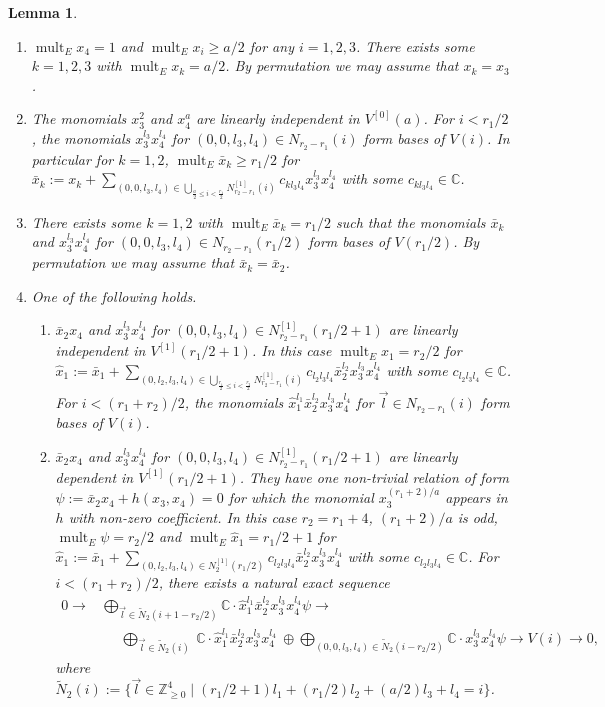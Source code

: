 \documentclass[a4paper,11pt]{amsart}
\newtheorem{lemma}[theorem]{Lemma}
\theoremstyle{definition}
\theoremstyle{remark}
\numberwithin{equation}{section}
\newcommand{\bC}{{\mathbb C}}
\newcommand{\bZ}{{\mathbb Z}}
\newcommand{\mult}{\operatorname{mult}}
\begin{document}
\begin{lemma}\label{lem:vector}
\begin{enumerate}
\item\label{itm:vector1}
$\mult_E x_4=1$ and $\mult_E x_i\ge a/2$ for any $i=1,2,3$.
There exists some $k=1,2,3$ with $\mult_E x_k=a/2$.
By permutation we may assume that $x_k=x_3$.
\item\label{itm:vector2}
The monomials $x_3^2$ and $x_4^a$ are linearly independent in $V^{[0]}(a)$.
For $i<r_1/2$,
the monomials $x_3^{l_3}x_4^{l_4}$ for
$(0,0,l_3,l_4)\in N_{r_2-r_1}(i)$
form bases of $V(i)$.
In particular for $k=1,2$,
$\mult_E \bar{x}_k \ge r_1/2$ for
$\bar{x}_k:=x_k+\sum_{(0,0,l_3,l_4)\in
\bigcup_{\frac{a}{2}\le i<\frac{r_1}{2}}N_{r_2-r_1}^{[1]}(i)}
c_{kl_3l_4}x_3^{l_3}x_4^{l_4}$
with some $c_{kl_3l_4}\in \bC$.
\item\label{itm:vector3}
There exists some $k=1,2$ with $\mult_E \bar{x}_k=r_1/2$ such that
the monomials $\bar{x}_k$ and $x_3^{l_3}x_4^{l_4}$ for
$(0,0,l_3,l_4)\in N_{r_2-r_1}(r_1/2)$ form bases of $V(r_1/2)$.
By permutation we may assume that $\bar{x}_k=\bar{x}_2$.
\item\label{itm:vector4}
One of the following holds.
\begin{enumerate}
\item
$\bar{x}_2x_4$ and $x_3^{l_3}x_4^{l_4}$ for
$(0,0,l_3,l_4)\in N_{r_2-r_1}^{[1]}(r_1/2+1)$
are linearly independent in $V^{[1]}(r_1/2+1)$.
In this case $\mult_E \hat{x}_1=r_2/2$ for
$\hat{x}_1:=\bar{x}_1+
\sum_{(0,l_2,l_3,l_4) \in
\bigcup_{\frac{r_1}{2}\le i<\frac{r_2}{2}}N_{r_2-r_1}^{[1]}(i)}
c_{l_2l_3l_4}\bar{x}_2^{l_2}x_3^{l_3}x_4^{l_4}$
with some $c_{l_2l_3l_4}\in \bC$.
For $i<(r_1+r_2)/2$,
the monomials $\hat{x}_1^{l_1}\bar{x}_2^{l_2}x_3^{l_3}x_4^{l_4}$ for
$\vec{l}\in N_{r_2-r_1}(i)$ form bases of $V(i)$.
\item
$\bar{x}_2x_4$ and $x_3^{l_3}x_4^{l_4}$ for
$(0,0,l_3,l_4)\in N_{r_2-r_1}^{[1]}(r_1/2+1)$
are linearly dependent in $V^{[1]}(r_1/2+1)$.
They have one non-trivial relation of form $\psi:=\bar{x}_2x_4+h(x_3,x_4)=0$
for which
the monomial $x_3^{(r_1+2)/a}$ appears in $h$ with non-zero coefficient.
In this case $r_2=r_1+4$,
$(r_1+2)/a$ is odd,
$\mult_E\psi=r_2/2$ and $\mult_E \hat{x}_1=r_1/2+1$ for
$\hat{x}_1:=\bar{x}_1+\sum_{(0,l_2,l_3,l_4)\in N_{2}^{[1]}(r_1/2)}
c_{l_2l_3l_4}\bar{x}_2^{l_2}x_3^{l_3}x_4^{l_4}$
with some $c_{l_2l_3l_4}\in \bC$.
For $i<(r_1+r_2)/2$,
there exists a natural exact sequence
\begin{align*}
0 \to \!\!\!\!\!\! &\bigoplus_{\vec{l}\in \tilde{N}_2(i+1-r_2/2)}\!\!\!\!\!\!
\bC \cdot \hat{x}_1^{l_1}\bar{x}_2^{l_2}x_3^{l_3}x_4^{l_4}\psi \to \\
&\quad\,\ \bigoplus_{\vec{l}\in \tilde{N}_2(i)} \
\bC \cdot \hat{x}_1^{l_1}\bar{x}_2^{l_2}x_3^{l_3}x_4^{l_4} \ \oplus
\!\!\!\!\!\!\!\!\!\!\!\! \bigoplus_{(0,0,l_3,l_4) \in \tilde{N}_2(i-r_2/2)}
\!\!\!\!\!\!\!\!\!\!\!\!
\bC \cdot x_3^{l_3}x_4^{l_4}\psi
\to V(i) \to 0,
\end{align*}
where $\tilde{N}_2(i):=\{\vec{l}\in\bZ_{\ge0}^4 \mid
(r_1/2+1)l_1+(r_1/2)l_2+(a/2)l_3+l_4=i\}$.
\end{enumerate}
\end{enumerate}
\end{lemma}
\end{document}
